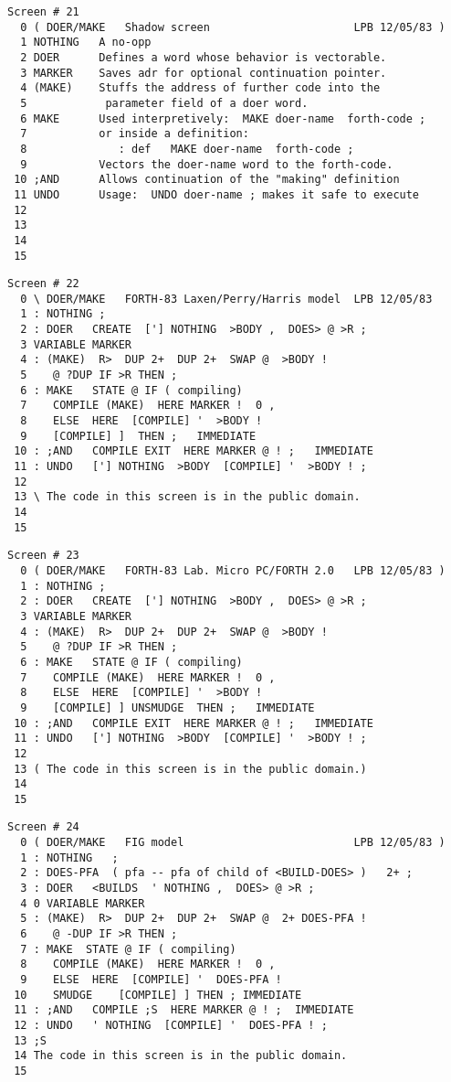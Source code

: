 \begin{verbatim}
Screen # 21
  0 ( DOER/MAKE   Shadow screen                      LPB 12/05/83 )
  1 NOTHING   A no-opp
  2 DOER      Defines a word whose behavior is vectorable.
  3 MARKER    Saves adr for optional continuation pointer.
  4 (MAKE)    Stuffs the address of further code into the
  5            parameter field of a doer word.
  6 MAKE      Used interpretively:  MAKE doer-name  forth-code ;
  7           or inside a definition:
  8              : def   MAKE doer-name  forth-code ;
  9           Vectors the doer-name word to the forth-code.
 10 ;AND      Allows continuation of the "making" definition
 11 UNDO      Usage:  UNDO doer-name ; makes it safe to execute
 12
 13
 14
 15
\end{verbatim}

\begin{verbatim}
Screen # 22
  0 \ DOER/MAKE   FORTH-83 Laxen/Perry/Harris model  LPB 12/05/83 
  1 : NOTHING ;
  2 : DOER   CREATE  ['] NOTHING  >BODY ,  DOES> @ >R ;
  3 VARIABLE MARKER
  4 : (MAKE)  R>  DUP 2+  DUP 2+  SWAP @  >BODY !
  5    @ ?DUP IF >R THEN ;
  6 : MAKE   STATE @ IF ( compiling)
  7    COMPILE (MAKE)  HERE MARKER !  0 ,
  8    ELSE  HERE  [COMPILE] '  >BODY !
  9    [COMPILE] ]  THEN ;   IMMEDIATE
 10 : ;AND   COMPILE EXIT  HERE MARKER @ ! ;   IMMEDIATE
 11 : UNDO   ['] NOTHING  >BODY  [COMPILE] '  >BODY ! ;
 12
 13 \ The code in this screen is in the public domain.
 14
 15
\end{verbatim}

\begin{verbatim}
Screen # 23
  0 ( DOER/MAKE   FORTH-83 Lab. Micro PC/FORTH 2.0   LPB 12/05/83 )
  1 : NOTHING ;
  2 : DOER   CREATE  ['] NOTHING  >BODY ,  DOES> @ >R ;
  3 VARIABLE MARKER
  4 : (MAKE)  R>  DUP 2+  DUP 2+  SWAP @  >BODY !
  5    @ ?DUP IF >R THEN ;
  6 : MAKE   STATE @ IF ( compiling)
  7    COMPILE (MAKE)  HERE MARKER !  0 ,
  8    ELSE  HERE  [COMPILE] '  >BODY !
  9    [COMPILE] ] UNSMUDGE  THEN ;   IMMEDIATE
 10 : ;AND   COMPILE EXIT  HERE MARKER @ ! ;   IMMEDIATE
 11 : UNDO   ['] NOTHING  >BODY  [COMPILE] '  >BODY ! ;
 12
 13 ( The code in this screen is in the public domain.)
 14
 15
\end{verbatim}

\begin{verbatim}
Screen # 24
  0 ( DOER/MAKE   FIG model                          LPB 12/05/83 )
  1 : NOTHING   ;
  2 : DOES-PFA  ( pfa -- pfa of child of <BUILD-DOES> )   2+ ;
  3 : DOER   <BUILDS  ' NOTHING ,  DOES> @ >R ;
  4 0 VARIABLE MARKER
  5 : (MAKE)  R>  DUP 2+  DUP 2+  SWAP @  2+ DOES-PFA !
  6    @ -DUP IF >R THEN ;
  7 : MAKE  STATE @ IF ( compiling)
  8    COMPILE (MAKE)  HERE MARKER !  0 ,
  9    ELSE  HERE  [COMPILE] '  DOES-PFA !
 10    SMUDGE    [COMPILE] ] THEN ; IMMEDIATE
 11 : ;AND   COMPILE ;S  HERE MARKER @ ! ;  IMMEDIATE
 12 : UNDO   ' NOTHING  [COMPILE] '  DOES-PFA ! ;
 13 ;S
 14 The code in this screen is in the public domain.
 15
\end{verbatim}

